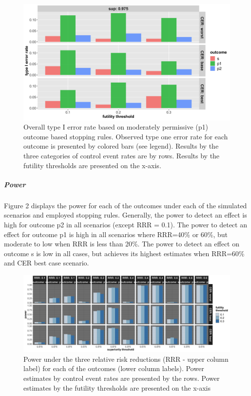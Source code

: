 \documentclass[]{article}
\let\oldsubparagraph\subparagraph
\renewcommand{\subparagraph}[1]{\oldsubparagraph{#1}\mbox{}}
\begin{document}
\begin{figure}
  \caption{Overall type I error rate based on moderately permissive (p1) outcome based stopping rules. Observed type one error rate for each outcome is
  presented by colored bars (see legend). Results by the three categories of control event rates are by rows. Results by the futility thresholds are
  presented on the x-axis.}
  \includegraphics{../p1_plots/batch_size_nb_1000/type_1_error_p1.png}
\end{figure}

\hypertarget{power}{%
\subparagraph{Power}\label{power}}

Figure 2 displays the power for each of the outcomes under each of the
simulated scenarios and employed stopping rules. Generally, the power to
detect an effect is high for outcome p2 in all scenarios (except RRR =
0.1). The power to detect an effect for outcome p1 is high in all
scenarios where RRR=40\% or 60\%, but moderate to low when RRR is less
than 20\%. The power to detect an effect on outcome s is low in all
cases, but achieves its highest estimates when RRR=60\% and CER best
case scenario.

\begin{figure}
  \caption{Power under the three relative risk reductions (RRR - upper column label) for each of the outcomes (lower column labels). 
  Power estimates by control event rates are presented by the rows. Power estimates by the futility thresholds are presented on the x-axis}
  \includegraphics{../p1_plots/batch_size_nb_1000/power_all_p1.png}
\end{figure}
\end{document}
